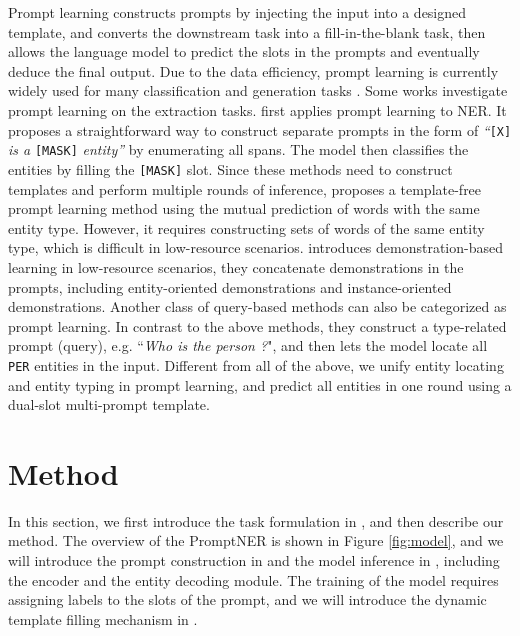 \documentclass[11pt]{article}
\begin{document}
Prompt learning constructs prompts by injecting the input into a designed template, and converts the downstream task into a fill-in-the-blank task, then allows the language model to predict the slots in the prompts and eventually deduce the final output. Due to the data efficiency, prompt learning is currently widely used for many classification and generation tasks \citep{shin-etal-2020-autoprompt, gao-etal-2021-making, schick-schutze-2021-just, schick-schutze-2021-exploiting, ding2021prompt}. Some works investigate prompt learning on the extraction tasks. \citet{cui-etal-2021-template} first applies prompt learning to NER. It proposes a straightforward way to construct separate prompts in the form of \textit{``}\texttt{[X]}\textit{ is a }\texttt{[MASK]}\textit{ entity''} by enumerating all spans. The model then classifies the entities by filling the \texttt{[MASK]} slot.
Since these methods need to construct templates and perform multiple rounds of inference, \citet{ma-etal-2022-template} proposes a template-free prompt learning method using the mutual prediction of words with the same entity type. However, it requires constructing sets of words of the same entity type, which is difficult in low-resource scenarios. 
\citet{lee-etal-2022-good} introduces demonstration-based learning in low-resource scenarios, they concatenate demonstrations in the prompts, including entity-oriented demonstrations and instance-oriented demonstrations.
Another class of query-based methods \citep{li-etal-2020-unified, mengge-etal-2020-coarse, liu2022qaner} can also be categorized as prompt learning. 
In contrast to the above methods, they construct a type-related prompt (query), e.g. ``\textit{Who is the person ?}", and then lets the model locate all \texttt{PER} entities in the input. 
Different from all of the above, we unify entity locating and entity typing in prompt learning, and predict all entities in one round using a dual-slot multi-prompt template.

\section{Method}

In this section, we first introduce the task formulation in , and then describe our method. The overview of the PromptNER is shown in Figure \ref{fig:model}, and we will introduce the prompt construction in  and the model inference in , including the encoder and the entity decoding module. The training of the model requires assigning labels to the slots of the prompt, and we will introduce the dynamic template filling mechanism in .
\end{document}
